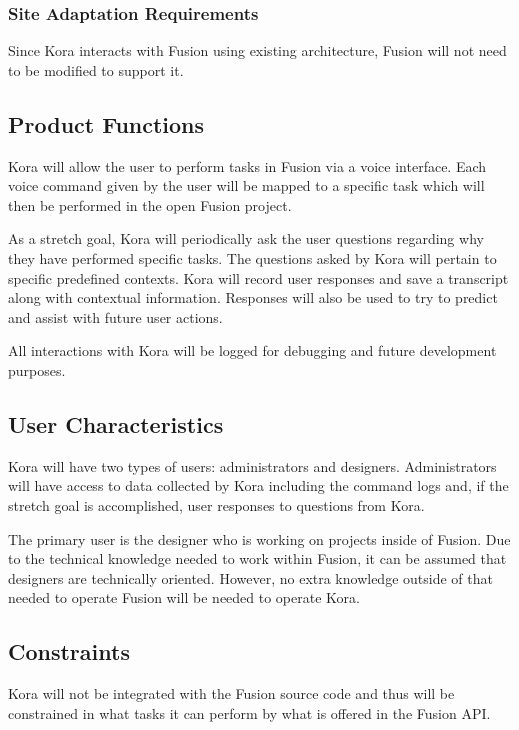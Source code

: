 \documentclass[onecolumn, draftclsnofoot,10pt, compsoc]{IEEEtran}
\def \botname{Kora\xspace}
\begin{document}

        \subsubsection{Site Adaptation Requirements} 
            Since \botname interacts with Fusion using existing architecture, Fusion will not need to be modified to support it. 

    \subsection{Product Functions}
        \botname will allow the user to perform tasks in Fusion via a voice interface. 
        Each voice command given by the user will be mapped to a specific task which will then be performed in the open Fusion project. 
       
        As a stretch goal, \botname will periodically ask the user questions regarding why they have performed specific tasks.
        The questions asked by \botname will pertain to specific predefined contexts.
		\botname will record user responses and save a transcript along with contextual information.
        Responses will also be used to try to predict and assist with future user actions. 

        All interactions with \botname will be logged for debugging and future development purposes.
        
    \subsection{User Characteristics}
		\botname will have two types of users: administrators and designers. 
		Administrators will have access to data collected by \botname including the command logs and, if the stretch goal is accomplished, user responses to questions from \botname. 
		
		The primary user is the designer who is working on projects inside of Fusion. 
        Due to the technical knowledge needed to work within Fusion, it can be assumed that designers are technically oriented.
        However, no extra knowledge outside of that needed to operate Fusion will be needed to operate \botname.
        
    \subsection{Constraints}
        \botname will not be integrated with the Fusion source code and thus will be constrained in what tasks it can perform by what is offered in the Fusion API. 
\end{document}

